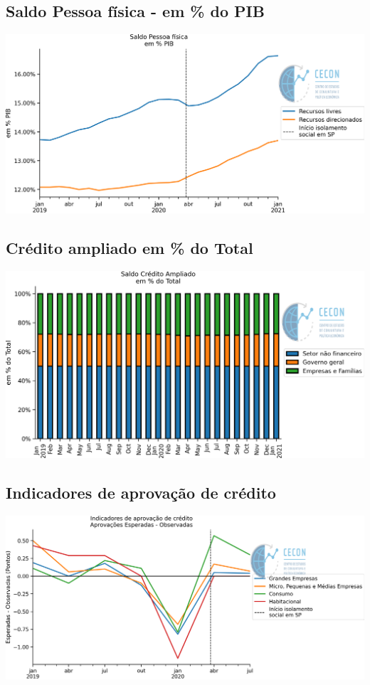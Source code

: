 \documentclass{SelfArx}
\begin{document}
\subsection*{Saldo Pessoa física - em \% do PIB}
\label{sec:orga21fdec}

\begin{center}
\includegraphics[width=.9\linewidth]{./figs/Credito/SaldoPF_PIB.png}
\end{center}


\subsection*{Crédito ampliado em \% do Total}
\label{sec:org11c3fb5}

\begin{center}
\includegraphics[width=.9\linewidth]{./figs/Credito/SaldoCreditoAmpliado_Total.png}
\end{center}

\subsection*{Indicadores de aprovação de crédito}
\label{sec:org7debc15}

\begin{center}
\includegraphics[width=.9\linewidth]{./figs/Credito/PTC.png}
\end{center}
\end{document}
